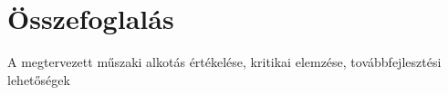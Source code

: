 \chapter*{Összefoglalás}

A megtervezett műszaki alkotás értékelése, kritikai elemzése, továbbfejlesztési lehetőségek